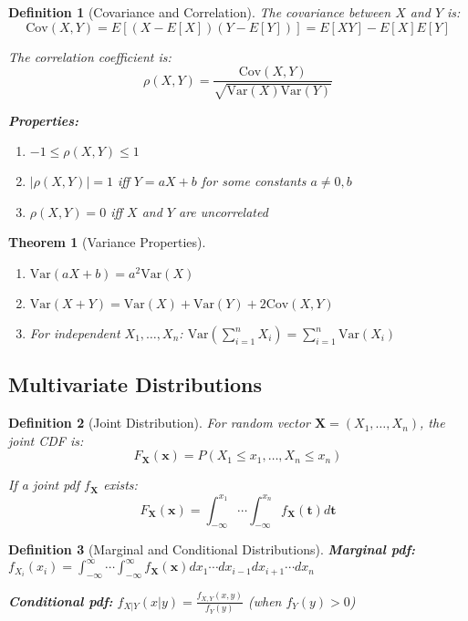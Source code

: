 \documentclass[12pt,a4paper]{article}
\newtheorem{theorem}{Theorem}[section]
\newtheorem{definition}{Definition}[section]
\theoremstyle{remark}
\begin{document}
\begin{definition}[Covariance and Correlation]
The covariance between $X$ and $Y$ is:
$$\text{Cov}(X,Y) = E[(X-E[X])(Y-E[Y])] = E[XY] - E[X]E[Y]$$

The correlation coefficient is:
$$\rho(X,Y) = \frac{\text{Cov}(X,Y)}{\sqrt{\text{Var}(X)\text{Var}(Y)}}$$

\textbf{Properties:}
\begin{enumerate}
\item $-1 \leq \rho(X,Y) \leq 1$
\item $|\rho(X,Y)| = 1$ iff $Y = aX + b$ for some constants $a \neq 0, b$
\item $\rho(X,Y) = 0$ iff $X$ and $Y$ are uncorrelated
\end{enumerate}
\end{definition}

\begin{theorem}[Variance Properties]
\begin{enumerate}
\item $\text{Var}(aX + b) = a^2\text{Var}(X)$
\item $\text{Var}(X + Y) = \text{Var}(X) + \text{Var}(Y) + 2\text{Cov}(X,Y)$
\item For independent $X_1, \ldots, X_n$: $\text{Var}\left(\sum_{i=1}^n X_i\right) = \sum_{i=1}^n \text{Var}(X_i)$
\end{enumerate}
\end{theorem}

\subsection{Multivariate Distributions}

\begin{definition}[Joint Distribution]
For random vector $\mathbf{X} = (X_1, \ldots, X_n)$, the joint CDF is:
$$F_{\mathbf{X}}(\mathbf{x}) = P(X_1 \leq x_1, \ldots, X_n \leq x_n)$$

If a joint pdf $f_{\mathbf{X}}$ exists:
$$F_{\mathbf{X}}(\mathbf{x}) = \int_{-\infty}^{x_1} \cdots \int_{-\infty}^{x_n} f_{\mathbf{X}}(\mathbf{t}) d\mathbf{t}$$
\end{definition}

\begin{definition}[Marginal and Conditional Distributions]
\textbf{Marginal pdf:} $f_{X_i}(x_i) = \int_{-\infty}^{\infty} \cdots \int_{-\infty}^{\infty} f_{\mathbf{X}}(\mathbf{x}) dx_1 \cdots dx_{i-1} dx_{i+1} \cdots dx_n$

\textbf{Conditional pdf:} $f_{X|Y}(x|y) = \frac{f_{X,Y}(x,y)}{f_Y(y)}$ (when $f_Y(y) > 0$)
\end{definition}
\end{document}
